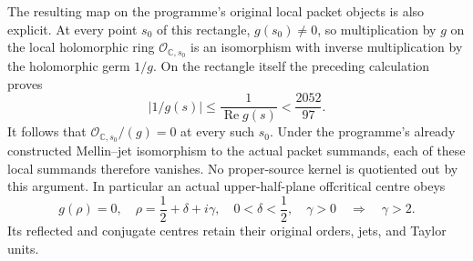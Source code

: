 The resulting map on the programme's original local packet objects
is also explicit.  At every point $s_0$ of this rectangle,
$g(s_0)\ne0$, so multiplication by $g$ on the local holomorphic
ring $\mathcal O_{\mathbb C,s_0}$ is an isomorphism with inverse
multiplication by the holomorphic germ $1/g$.  On the rectangle
itself the preceding calculation proves
\[
 |1/g(s)|\leq\frac1{\operatorname{Re}g(s)}
                  <\frac{2052}{97}.
\tag{LHT.17}
\]
It follows that
$\mathcal O_{\mathbb C,s_0}/(g)=0$ at every such $s_0$.
Under the programme's already constructed Mellin--jet isomorphism
to the actual packet summands, each of these local summands therefore
vanishes.  No proper-source kernel is quotiented out by
this argument.  In particular an actual upper-half-plane offcritical
centre obeys
\[
 g(\rho)=0,\quad
 \rho=\frac12+\delta+i\gamma,\quad
 0<\delta<\frac12,\quad \gamma>0
 \quad\Longrightarrow\quad \gamma>2.
\tag{LHT.18}
\]
Its reflected and conjugate centres retain their original orders,
jets, and Taylor units.
